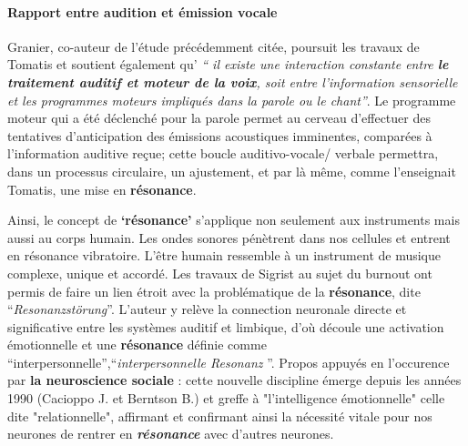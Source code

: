 \paragraph{Rapport entre audition et émission vocale}


Granier, co-auteur de l'étude  précédemment citée, poursuit les travaux de Tomatis et soutient 
également qu'\textit{ ``{ il existe une
interaction
constante entre  \textbf{le traitement auditif et moteur de la
voix}, soit entre l'information sensorielle et les programmes moteurs impliqués
dans la parole ou le chant}''}\autocite{affectiveDisorders}.
Le programme moteur qui a été déclenché
pour la parole permet au cerveau d'effectuer des tentatives d'anticipation
des émissions acoustiques imminentes, comparées à l'information
auditive reçue; cette boucle
auditivo-vocale/ verbale permettra, dans un processus circulaire, un ajustement,
et par là même, comme l'enseignait Tomatis, une mise en \textbf{résonance}.

Ainsi, le concept de \textbf{`résonance'} s'applique non seulement aux instruments mais aussi au corps humain. Les ondes sonores pénètrent dans nos cellules et entrent en résonance vibratoire. L'être humain ressemble à un instrument de musique complexe, unique et accordé.
Les travaux de Sigrist au sujet du burnout ont permis de faire un lien étroit avec la problématique de la
 \textbf{résonance}, dite \enquote{\textit{Resonanzstörung}}.
L'auteur y relève la connection neuronale
directe et significative entre les systèmes auditif et
         limbique, d'où découle une activation émotionnelle et une
         \textbf{résonance} définie comme
         ``interpersonnelle'',\enquote{\textit{interpersonnelle
             Resonanz} }\autocite[55--90] {sigrist_burnout_2016}.
Propos appuyés en l'occurence par \textbf{la neuroscience sociale} \autocite[201]{van_eersel_cerveau}:  
cette nouvelle discipline émerge depuis
les années 1990 (Cacioppo J. et Berntson B.) et greffe à "l'intelligence
émotionnelle" celle dite "relationnelle", affirmant et confirmant ainsi la nécessité vitale pour nos 
neurones  de rentrer en
 \textbf{ \textit{résonance} }avec d'autres neurones.

